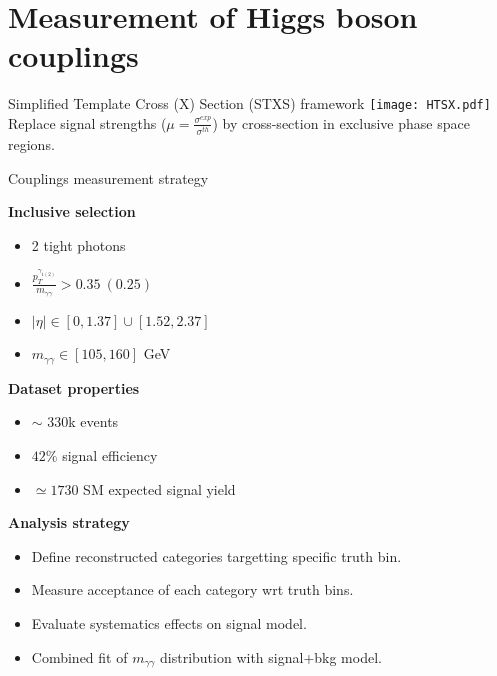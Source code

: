\section{Measurement of Higgs boson couplings}
\frame{\tableofcontents[currentsection]}

\begin{frame}{Simplified Template Cross (X) Section (STXS) framework}
  \centering
  \texttt{[image: HTSX.pdf]}\\
  Replace signal strengths ($\mu=\frac{\sigma^{exp}}{\sigma^{th}}$) by cross-section in exclusive phase space regions.
\end{frame}
\begin{frame}{Couplings measurement strategy}

  \begin{minipage}{0.49\linewidth}
  {\bf Inclusive selection }
  \begin{itemize}
  \item 2 tight photons
  \item $\frac{p_T^{\gamma_{1(2)}}}{m_{\gamma\gamma}} > 0.35~ (0.25)$
  \item $|\eta|\in [0, 1.37]  \cup [1.52, 2.37]$
  \item $m_{\gamma\gamma} \in [105, 160]$ GeV
  \end{itemize}
  \end{minipage}
  \hfill
  \begin{minipage}{0.49\linewidth}
    {\bf Dataset properties}  

    \begin{itemize}
    \item $\sim$ 330k events
    \item $42\%$ signal efficiency
    \item $\simeq 1730$ SM expected signal yield
    \end{itemize}
  \end{minipage}
  \vfill
  {\bf Analysis strategy } 
  \begin{itemize}
  \item Define reconstructed categories targetting specific truth bin.
  \item Measure acceptance of each category wrt truth bins.
  \item Evaluate systematics effects on signal model.
  \item Combined fit of $m_{\gamma\gamma}$ distribution with signal+bkg model.
  \end{itemize}

\end{frame}

